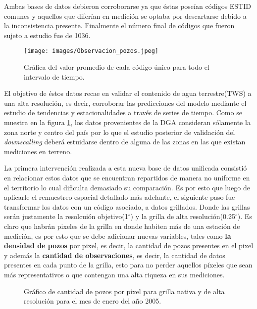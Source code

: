     Ambas bases de datos debieron corroborarse ya que éstas poseían códigos ESTID comunes y aquellos que diferían en medición se optaba por descartarse debido a la inconsistencia presente.
    Finalmente el número final de códigos que fueron sujeto a estudio fue de 1036. 

    \begin{figure}[H]
        \centering
              \texttt{[image: images/Observacion\_pozos.jpeg]}
        \caption[Datos de Pozos DGA sin procesar]{\footnotesize Gráfica del valor promedio de cada código único para todo el intervalo de tiempo.}
        \label{pozosDGA}
    \end{figure}

    El objetivo de éstos datos recae en validar el contenido de agua terrestre(TWS) a una alta resolución, es decir, corroborar las predicciones del modelo mediante el estudio de tendencias y estacionalidades a través de series de tiempo. 
    Como se muestra en la figura \ref{pozosDGA}, los datos provenientes de la DGA consideran sólamente la zona norte y centro del país por lo que el estudio posterior de validación del
    \textit{downscalling} deberá estuidarse dentro de alguna de las zonas en las que existan mediciones en terreno.

    La primera intervención realizada a esta nueva base de datos unificada consistió en relacionar estos datos que se encuentran repartidos de manera no uniforme en el territorio
    lo cual dificulta demasiado su comparación. Es por esto que luego de aplicarle el remuestreo espacial detallado más adelante, el siguiente paso fue transformar los datos con un código asociado,
    a datos grillados. Donde las grillas serán justamente la resolcuión objetivo(1$^{\circ}$) y la grilla de alta resolución(0.25$^{\circ}$). Es claro que habrán pixeles de la grilla en donde 
    habiten más de una estación de medición, es por esto que se debe adicionar nuevas variables, tales como \textbf{la densidad de pozos} por pixel, es decir, la cantidad de pozos presentes en el pixel y además
    la \textbf{cantidad de observaciones}, es decir, la cantidad de datos presentes en cada punto de la grilla, esto para no perder aquellos píxeles que sean más representativos o que 
    contengan una alta riqueza en sus mediciones.

    \begin{figure}[H]
        \centering
              \goodgap
              \vskip -0.1in
        \caption[Cantidad de pozos en cada grilla]{Gráfico de cantidad de pozos por píxel para grilla nativa y de alta resolución para el mes de enero del año 2005.}
        \label{pixeldepth}
    \end{figure}

